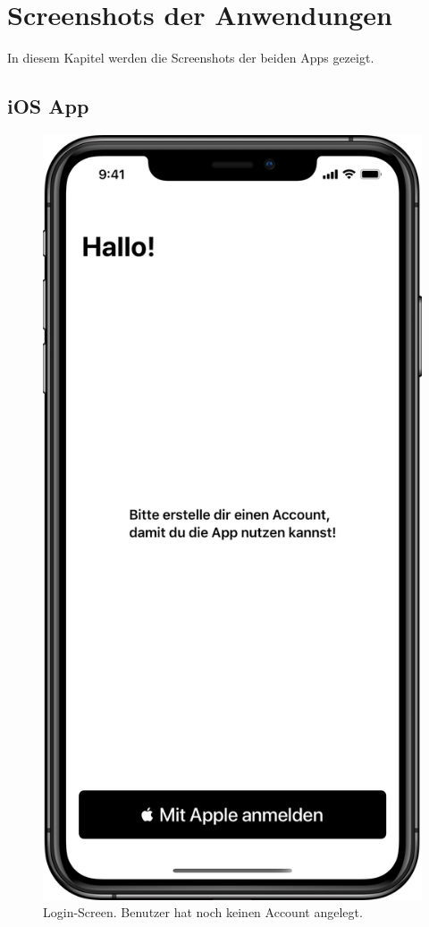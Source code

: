 \section{Screenshots der Anwendungen}

In diesem Kapitel werden die Screenshots der beiden Apps gezeigt.

\subsection{iOS App}

\begin{minipage}{.45\textwidth}
	\begin{figure}[H]
		\centering
		\includegraphics[width=.68\textwidth]{./images/prototype/ios/loginNoAccount.png}
		\caption{\label{fig:app:ios:loginNoAccount}Login-Screen. Benutzer hat noch keinen Account angelegt.}
	\end{figure}
\end{minipage}\hfill
